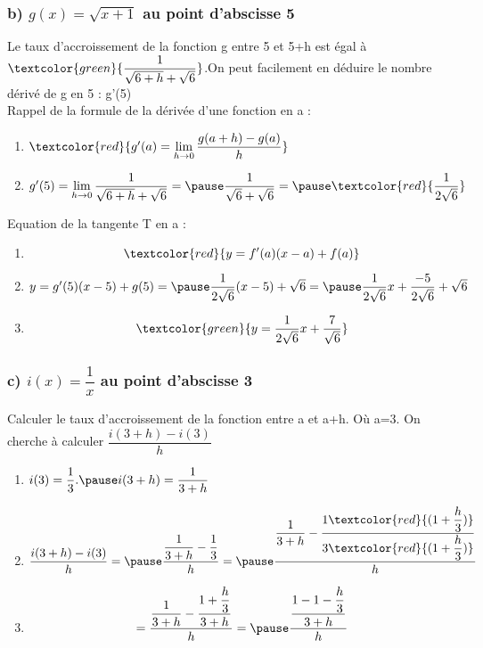 \documentclass[t]{beamer}
\begin{document}
\begin{frame}[label=pagebanale]
\frametitle{b) $g(x) = \sqrt{x+1}$ au point d'abscisse 5}
\pause
Le taux d'accroissement de la fonction g entre 5 et 5+h est égal à \pause $\textcolor{green}{\dfrac{1}{\sqrt{6+h} + \sqrt{6}}}$.\pause On peut facilement en déduire le nombre dérivé de g en 5 : g'(5) \\
\pause
Rappel de la formule de la dérivée d'une fonction en a :
\pause 
\begin{enumerate}[]
\item<+-> \(\textcolor{red}{g'(a) = \lim\limits_{h \rightarrow 0}\dfrac{g(a+h)-g(a)}{h}}\)
\item<+-> \(g'(5) = \lim\limits_{h \rightarrow 0}\dfrac{1}{\sqrt{6+h} + \sqrt{6}} = \pause \dfrac{1}{\sqrt{6} + \sqrt{6}} = \pause \textcolor{red}{\dfrac{1}{2\sqrt{6}}}\)
\pause
\end{enumerate}

Equation de la tangente T en a :
\pause
\begin{enumerate}[]
\item<+-> \[\textcolor{red}{y = f'(a)(x-a) + f(a)}\]
\item<+-> \(y=g'(5)(x-5) + g(5) = \pause \dfrac{1}{2 \sqrt{6}}(x-5) + \sqrt{6}  = \pause \dfrac{1}{2 \sqrt{6}}x + \dfrac{-5}{2 \sqrt{6}} + \sqrt{6} \)
\pause
\item<+-> \[\textcolor{green}{y = \dfrac{1}{2\sqrt{6}}x + \dfrac{7}{\sqrt{6}}}\]
\end{enumerate}
\end{frame}

\begin{frame}
\frametitle{c) $i(x) = \dfrac{1}{x}$ au point d'abscisse 3}
\pause
Calculer le taux d'accroissement de la fonction entre a et a+h. \pause Où a=3.
\pause
On cherche à calculer \( \dfrac{i(3+h) - i(3)}{h} \)
\pause
\begin{enumerate}[]
\item<+-> \(i(3) = \dfrac{1}{3}. \pause i(3+h) = \dfrac{1}{3+h}\) 
\pause
\item<+-> \[\dfrac{i(3+h) - i(3)}{h} = \pause \dfrac{\dfrac{1}{3+h} - \dfrac{1}{3} }{h} = \pause \dfrac{\dfrac{1}{3+h}-\dfrac{1\textcolor{red}{(1+\dfrac{h}{3})}}{3\textcolor{red}{(1+\dfrac{h}{3})}}}{h}\]
\pause
\item<+-> \[ = \dfrac{\dfrac{1}{3+h}-\dfrac{1+\dfrac{h}{3}}{3+h}}{h} = \pause \dfrac{\dfrac{1-1-\dfrac{h}{3}}{3+h}}{h} \]
\end{enumerate}

\end{frame}
\end{document}
